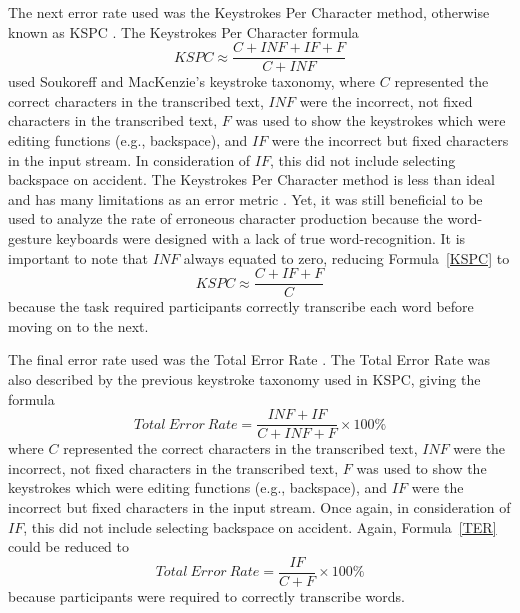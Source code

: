 The next error rate used was the Keystrokes Per Character method, otherwise known as KSPC \cite{ref_error_rates}. The Keystrokes Per Character formula
\begin{equation} \label{KSPC}
KSPC \approx \frac{C + INF + IF + F}{C + INF}
\end{equation}
used Soukoreff and MacKenzie's keystroke taxonomy, where $C$ represented the correct characters in the transcribed text, $INF$ were the incorrect, not fixed characters in the transcribed text, $F$ was used to show the keystrokes which were editing functions (e.g., backspace), and $IF$ were the incorrect but fixed characters in the input stream. In consideration of $IF$, this did not include selecting backspace on accident. The Keystrokes Per Character method is less than ideal and has many limitations as an error metric \cite{ref_error_rates}. Yet, it was still beneficial to be used to analyze the rate of erroneous character production because the word-gesture keyboards were designed with a lack of true word-recognition. It is important to note that $INF$ always equated to zero, reducing Formula~\ref{KSPC} to
\begin{equation} \label{KSPC_simple}
KSPC \approx \frac{C + IF + F}{C}
\end{equation}
because the task required participants correctly transcribe each word before moving on to the next.

The final error rate used was the Total Error Rate \cite{ref_error_rates}. The Total Error Rate was also described by the previous keystroke taxonomy used in KSPC, giving the formula
\begin{equation} \label{TER}{
	Total\ Error\ Rate = \frac{INF + IF}{C + INF + F} \times 100\%
}
\end{equation}
where $C$ represented the correct characters in the transcribed text, $INF$ were the incorrect, not fixed characters in the transcribed text, $F$ was used to show the keystrokes which were editing functions (e.g., backspace), and $IF$ were the incorrect but fixed characters in the input stream. Once again, in consideration of $IF$, this did not include selecting backspace on accident. Again, Formula~\ref{TER} could be reduced to
\begin{equation} \label{TER_simple}
Total\ Error\ Rate = \frac{IF}{C + F} \times 100\%
\end{equation}
because participants were required to correctly transcribe words.


